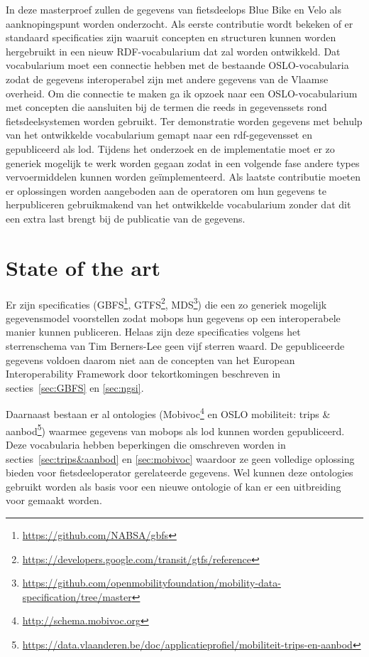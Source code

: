 In deze masterproef zullen de gegevens van \glspl{fietsdeelop} Blue Bike en Velo als aanknopingspunt worden onderzocht. Als eerste contributie wordt bekeken of er standaard specificaties zijn waaruit concepten en structuren kunnen worden hergebruikt in een nieuw RDF-vocabularium dat zal worden ontwikkeld. 
Dat vocabularium moet een connectie hebben met de bestaande OSLO-vocabularia zodat de gegevens interoperabel zijn met andere gegevens van de Vlaamse overheid. Om die connectie te maken ga ik opzoek naar een OSLO-vocabularium met concepten die aansluiten bij de termen die reeds in gegevenssets rond fietsdeelsystemen worden gebruikt.
Ter demonstratie worden gegevens met behulp van het ontwikkelde vocabularium gemapt naar een \acrshort{rdf}-gegevensset en gepubliceerd als \acrlong{lod}. Tijdens het onderzoek en de implementatie moet er zo generiek mogelijk te werk worden gegaan zodat in een volgende fase andere types vervoermiddelen kunnen worden geïmplementeerd. Als laatste contributie moeten er oplossingen worden aangeboden aan de operatoren om hun gegevens te herpubliceren gebruikmakend van het ontwikkelde vocabularium zonder dat dit een extra last brengt bij de publicatie van de gegevens.

\chapter{State of the art}

Er zijn specificaties (GBFS\footnote{\url{https://github.com/NABSA/gbfs}}, GTFS\footnote{\url{https://developers.google.com/transit/gtfs/reference}}, MDS\footnote{\url{https://github.com/openmobilityfoundation/mobility-data-specification/tree/master}}) die een zo generiek mogelijk gegevensmodel voorstellen zodat \glspl{mobop} hun gegevens op een interoperabele manier kunnen publiceren. Helaas zijn deze specificaties volgens het sterrenschema van Tim Berners-Lee geen vijf sterren waard. De gepubliceerde gegevens voldoen daarom niet aan de concepten van het European Interoperability Framework door tekortkomingen beschreven in secties~\ref{sec:GBFS} en \ref{sec:ngsi}.

Daarnaast bestaan er al \glspl{ontologie} (Mobivoc\footnote{\url{http://schema.mobivoc.org}} en OSLO mobiliteit: trips \& aanbod\footnote{\url{https://data.vlaanderen.be/doc/applicatieprofiel/mobiliteit-trips-en-aanbod}}) waarmee gegevens van \glspl{mobop} als \acrshort{lod} kunnen worden gepubliceerd. Deze vocabularia hebben beperkingen die omschreven worden in secties~\ref{sec:trips&aanbod} en \ref{sec:mobivoc} waardoor ze geen volledige oplossing bieden voor fietsdeeloperator gerelateerde gegevens. Wel kunnen deze \glspl{ontologie} gebruikt worden als basis voor een nieuwe ontologie of kan er een uitbreiding voor gemaakt worden. 

